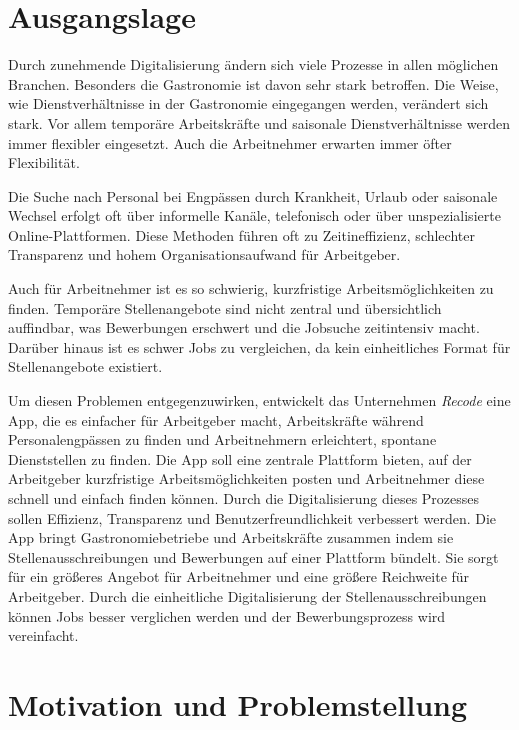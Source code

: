 \setauthor{\secondauthor}
\section{Ausgangslage}

Durch zunehmende Digitalisierung ändern sich viele Prozesse in allen möglichen Branchen.
Besonders die Gastronomie ist davon sehr stark betroffen. Die Weise, wie Dienstverhältnisse
in der Gastronomie eingegangen werden, verändert sich stark. Vor allem temporäre Arbeitskräfte und saisonale 
Dienstverhältnisse werden immer flexibler eingesetzt. Auch die Arbeitnehmer erwarten immer 
öfter Flexibilität.

Die Suche nach Personal bei Engpässen durch Krankheit, Urlaub oder saisonale Wechsel
erfolgt oft über informelle Kanäle, telefonisch oder über unspezialisierte
Online-Plattformen. Diese Methoden führen oft zu Zeitineffizienz, schlechter Transparenz
und hohem Organisationsaufwand für Arbeitgeber.

Auch für Arbeitnehmer ist es so schwierig, kurzfristige Arbeitsmöglichkeiten zu finden.
Temporäre Stellenangebote sind nicht zentral und übersichtlich auffindbar, was Bewerbungen
erschwert und die Jobsuche zeitintensiv macht. Darüber hinaus ist es schwer Jobs zu
vergleichen, da kein einheitliches Format für Stellenangebote existiert.

Um diesen Problemen entgegenzuwirken, entwickelt das Unternehmen
\textit{Recode} eine App, die es einfacher für Arbeitgeber macht, Arbeitskräfte während 
Personalengpässen zu finden und Arbeitnehmern erleichtert, spontane Dienststellen zu finden. Die App soll eine zentrale Plattform bieten, auf der Arbeitgeber kurzfristige Arbeitsmöglichkeiten posten und Arbeitnehmer diese schnell und einfach finden können. Durch die Digitalisierung dieses Prozesses sollen Effizienz, Transparenz und Benutzerfreundlichkeit verbessert werden.
Die App bringt Gastronomiebetriebe und Arbeitskräfte zusammen indem sie Stellenausschreibungen
und Bewerbungen auf einer Plattform bündelt. Sie sorgt für ein größeres Angebot für 
Arbeitnehmer und eine größere Reichweite für Arbeitgeber. Durch die einheitliche
Digitalisierung der Stellenausschreibungen können Jobs besser verglichen werden und der 
Bewerbungsprozess wird vereinfacht.

\section{Motivation und Problemstellung}

